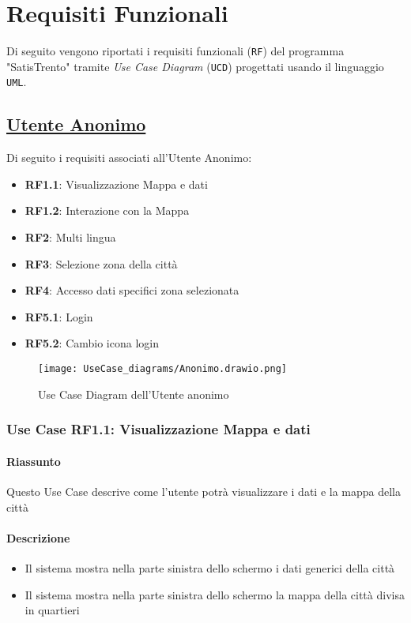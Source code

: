 \chapter{Requisiti Funzionali}
\label{ch:requisitiFunzionali}

Di seguito vengono riportati i requisiti funzionali (\texttt{RF}) del programma "SatisTrento" tramite \textit{Use Case Diagram} (\texttt{UCD}) progettati usando il linguaggio \texttt{UML}.

\section{\underline{Utente Anonimo}}
    Di seguito i requisiti associati all'Utente Anonimo:
    \begin{itemize}
        \item \textbf{RF1.1}: Visualizzazione Mappa e dati
        \item \textbf{RF1.2}: Interazione con la Mappa
        \item \textbf{RF2}: Multi lingua
        \item \textbf{RF3}: Selezione zona della città
        \item \textbf{RF4}: Accesso dati specifici zona selezionata
        \item \textbf{RF5.1}: Login
        \item \textbf{RF5.2}: Cambio icona login
    \end{itemize}
    \begin{figure}[H]
        \centering
        \texttt{[image: UseCase\_diagrams/Anonimo.drawio.png]}
        \caption{Use Case Diagram dell'Utente anonimo}
    \end{figure}

    \subsection{Use Case RF1.1: Visualizzazione Mappa e dati}
        \subsubsection{Riassunto}
            Questo Use Case descrive come l'utente potrà visualizzare i dati e la mappa della città
        \subsubsection{Descrizione}
            \begin{itemize}
                \item Il sistema mostra nella parte sinistra dello schermo i dati generici della città
                \item Il sistema mostra nella parte sinistra dello schermo la mappa della città divisa in quartieri
            \end{itemize}
    
